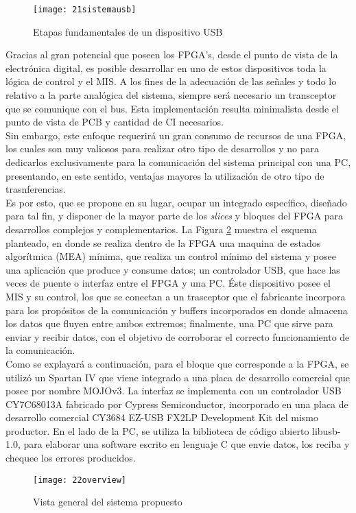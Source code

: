 \begin{figure}
	\centering
	\texttt{[image: 21sistemausb]}
	\caption{Etapas fundamentales de un dispositivo USB}
	\label{usbDeviceScheme}
\end{figure}

Gracias al gran potencial que poseen los FPGA's, desde el punto de vista de la electrónica digital, es posible desarrollar en uno de estos dispositivos toda la lógica de control y el MIS. A los fines de la adecuación de las señales y todo lo relativo a la parte analógica del sistema, siempre será necesario un transceptor que se comunique con el bus. Esta implementación resulta minimalista desde el punto de vista de PCB y cantidad de CI necesarios.\\

Sin embargo, este enfoque requerirá un gran consumo de recursos de una FPGA, los cuales son muy valiosos para realizar otro tipo de desarrollos y no para dedicarlos exclusivamente para la comunicación del sistema principal con una PC, presentando, en este sentido, ventajas mayores la utilización de otro tipo de trasnferencias.\\

Es por esto, que se propone en su lugar, ocupar un integrado específico, diseñado para tal fin, y disponer de la mayor parte de los {\it slices} y bloques del FPGA para desarrollos complejos y complementarios. La Figura \ref{overview} muestra el esquema planteado, en donde se realiza dentro de la FPGA una maquina de estados algorítmica (MEA) mínima, que realiza un control mínimo del sistema y posee una aplicación que produce y consume datos; un controlador USB, que hace las veces de puente o interfaz entre el FPGA y una PC. Éste dispositivo posee el MIS y su control, los que se conectan a un trasceptor que el fabricante incorpora para los propósitos de la comunicación y buffers incorporados en donde almacena los datos que fluyen entre ambos extremos; finalmente, una PC que sirve para enviar y recibir datos, con el objetivo de corroborar el correcto funcionamiento de la comunicación.\\

Como se explayará a continuación, para el bloque que corresponde a la FPGA, se utilizó un Spartan IV que viene integrado a una placa de desarrollo comercial que posee por nombre MOJOv3. La interfaz se implementa con un controlador USB CY7C68013A fabricado por Cypress Semiconductor, incorporado en una placa de desarrollo comercial CY3684 EZ-USB FX2LP Development Kit del mismo productor. En el lado de la PC, se utiliza la biblioteca de código abierto libusb-1.0, para elaborar una software escrito en lenguaje C que envie datos, los reciba y chequee los errores producidos.\\ 

\begin{figure}
	\centering
	\texttt{[image: 22overview]}
	\caption{Vista general del sistema propuesto}
	\label{overview}
\end{figure}